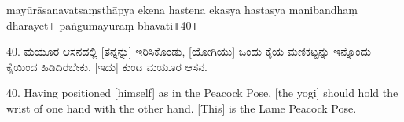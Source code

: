 \dummyimage
\begin{sans}
mayūrāsanavatsaṃsthāpya ekena hastena ekasya hastasya maṇibandhaṃ dhārayet। paṅgumayūraṃ bhavati॥40॥
\end{sans}
\bigskip

\begin{kan}
40.	ಮಯೂರ ಆಸನದಲ್ಲಿ [ತನ್ನನ್ನು] ಇರಿಸಿಕೊಂಡು, [ಯೋಗಿಯು] ಒಂದು ಕೈಯ ಮಣಿಕಟ್ಟನ್ನು ಇನ್ನೊಂದು ಕೈಯಿಂದ ಹಿಡಿದಿರಬೇಕು. [ಇದು] ಕುಂಟ ಮಯೂರ ಆಸನ.
\end{kan}
\bigskip

\begin{eng}
40. Having positioned [himself] as in the Peacock Pose, [the yogi] should hold the wrist of one hand with the other hand. [This] is the Lame Peacock Pose.
\end{eng}





